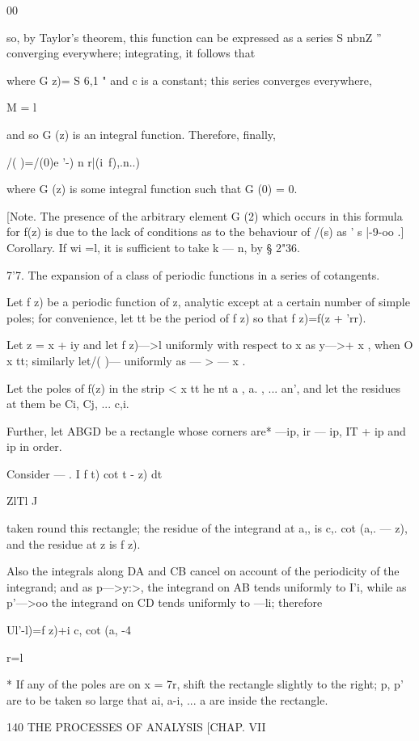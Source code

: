 {00

so, by Taylor's theorem, this function can be expressed as a series S
nbnZ ''~ converging everywhere; integrating, it follows that

where G z)= S 6,1 " and c is a constant; this series converges
everywhere,

M = l

and so G (z) is an integral function. Therefore, finally,

/( )=/(0)e '-) n r|(i\ f),.n..)

where G (z) is some integral function such that G (0) = 0.

[Note. The presence of the arbitrary element G (2) which occurs in
this formula for f(z) is due to the lack of conditions as to the
behaviour of /(s) as ' s |-9-oo .] Corollary. If wi =l, it is
sufficient to take k — n, by § 2"36.

7'7. The expansion of a class of periodic functions in a series of
cotangents.

Let f z) be a periodic function of z, analytic except at a certain
number of simple poles; for convenience, let tt be the period of f z)
so that f z)=f(z + 'rr).

Let z = x + iy and let f z)—>l uniformly with respect to x as y—>+ x ,
when O x tt; similarly let/( )— uniformly as — > — x .

Let the poles of f(z) in the strip < x tt he nt a , a. , ... an', and
let the residues at them be Ci, Cj, ... c,i.

Further, let ABGD be a rectangle whose corners are* —ip, ir — ip, IT +
ip and ip in order.

Consider — . I f t) cot t - z) dt

ZlTl J

taken round this rectangle; the residue of the integrand at a,, is
c,. cot (a,. — z), and the residue at z is f z).

Also the integrals along DA and CB cancel on account of the
periodicity of the integrand; and as p—>y:>, the integrand on AB tends
uniformly to I'i, while as p'—>oo the integrand on CD tends uniformly
to —li; therefore

Ul'-l)=f z)+i c, cot (a, -4

r=l

* If any of the poles are on x = 7r, shift the rectangle slightly to
the right; p, p' are to be taken so large that ai, a-i, ... a are
inside the rectangle.

140 THE PROCESSES OF ANALYSIS [CHAP. VII

}
